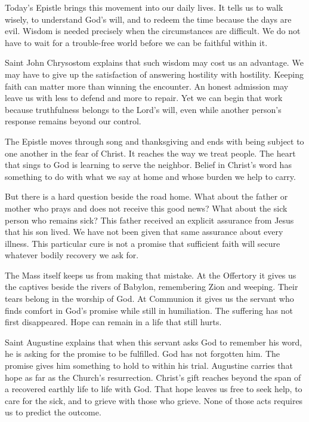 Today's Epistle brings this movement into our daily lives. It tells
us to walk wisely, to understand God's will, and to redeem the time
because the days are evil. Wisdom is needed precisely when the
circumstances are difficult. We do not have to wait for a trouble-free
world before we can be faithful within it.

Saint John Chrysostom explains that such wisdom may cost us an
advantage. We may have to give up the satisfaction of answering
hostility with hostility. Keeping faith can matter more than winning
the encounter. An honest admission may leave us with less to defend and
more to repair. Yet we can begin that work because truthfulness
belongs to the Lord's will, even while another person's response
remains beyond our control.

The Epistle moves through song and thanksgiving and ends with being
subject to one another in the fear of Christ. It reaches the way we
treat people. The heart that sings to God is learning to serve the
neighbor. Belief in Christ's word has something to do with what we
say at home and whose burden we help to carry.

But there is a hard question beside the road home. What about the
father or mother who prays and does not receive this good news?
What about the sick person who remains sick? This father received
an explicit assurance from Jesus that his son lived. We have not
been given that same assurance about every illness. This particular
cure is not a promise that sufficient faith will secure whatever
bodily recovery we ask for.

The Mass itself keeps us from making that mistake. At the Offertory
it gives us the captives beside the rivers of Babylon, remembering
Zion and weeping. Their tears belong in the worship of God. At
Communion it gives us the servant who finds comfort in God's promise
while still in humiliation. The suffering has not first disappeared.
Hope can remain in a life that still hurts.

Saint Augustine explains that when this servant asks God to remember
his word, he is asking for the promise to be fulfilled. God has not
forgotten him. The promise gives him something to hold to within
his trial. Augustine carries that hope as far as the Church's
resurrection. Christ's gift reaches beyond the span of a recovered
earthly life to life with God. That hope leaves us free to seek help,
to care for the sick, and to grieve with those who grieve. None of
those acts requires us to predict the outcome.

